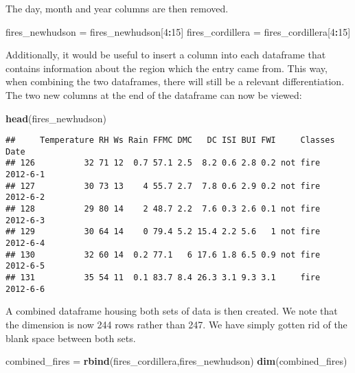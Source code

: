\documentclass[
]{article}
\newenvironment{Shaded}{\begin{snugshade}}{\end{snugshade}}
\newcommand{\DecValTok}[1]{\textcolor[rgb]{0.00,0.00,0.81}{#1}}
\newcommand{\FunctionTok}[1]{\textcolor[rgb]{0.13,0.29,0.53}{\textbf{#1}}}
\newcommand{\NormalTok}[1]{#1}
\newcommand{\OtherTok}[1]{\textcolor[rgb]{0.56,0.35,0.01}{#1}}
\newcommand{\SpecialCharTok}[1]{\textcolor[rgb]{0.81,0.36,0.00}{\textbf{#1}}}
\begin{document}
The day, month and year columns are then removed.

\begin{Shaded}
\begin{Highlighting}[]
\NormalTok{fires\_newhudson }\OtherTok{=}\NormalTok{ fires\_newhudson[}\DecValTok{4}\SpecialCharTok{:}\DecValTok{15}\NormalTok{]}
\NormalTok{fires\_cordillera }\OtherTok{=}\NormalTok{ fires\_cordillera[}\DecValTok{4}\SpecialCharTok{:}\DecValTok{15}\NormalTok{]}
\end{Highlighting}
\end{Shaded}

Additionally, it would be useful to insert a column into each dataframe
that contains information about the region which the entry came from.
This way, when combining the two dataframes, there will still be a
relevant differentiation. The two new columns at the end of the
dataframe can now be viewed:

\begin{Shaded}
\begin{Highlighting}[]
\FunctionTok{head}\NormalTok{(fires\_newhudson)}
\end{Highlighting}
\end{Shaded}

\begin{verbatim}
##     Temperature RH Ws Rain FFMC DMC   DC ISI BUI FWI     Classes     Date
## 126          32 71 12  0.7 57.1 2.5  8.2 0.6 2.8 0.2 not fire    2012-6-1
## 127          30 73 13    4 55.7 2.7  7.8 0.6 2.9 0.2 not fire    2012-6-2
## 128          29 80 14    2 48.7 2.2  7.6 0.3 2.6 0.1 not fire    2012-6-3
## 129          30 64 14    0 79.4 5.2 15.4 2.2 5.6   1 not fire    2012-6-4
## 130          32 60 14  0.2 77.1   6 17.6 1.8 6.5 0.9 not fire    2012-6-5
## 131          35 54 11  0.1 83.7 8.4 26.3 3.1 9.3 3.1     fire    2012-6-6
\end{verbatim}

A combined dataframe housing both sets of data is then created. We note
that the dimension is now 244 rows rather than 247. We have simply
gotten rid of the blank space between both sets.

\begin{Shaded}
\begin{Highlighting}[]
\NormalTok{combined\_fires }\OtherTok{=} \FunctionTok{rbind}\NormalTok{(fires\_cordillera,fires\_newhudson)}
\FunctionTok{dim}\NormalTok{(combined\_fires)}
\end{Highlighting}
\end{Shaded}
\end{document}
